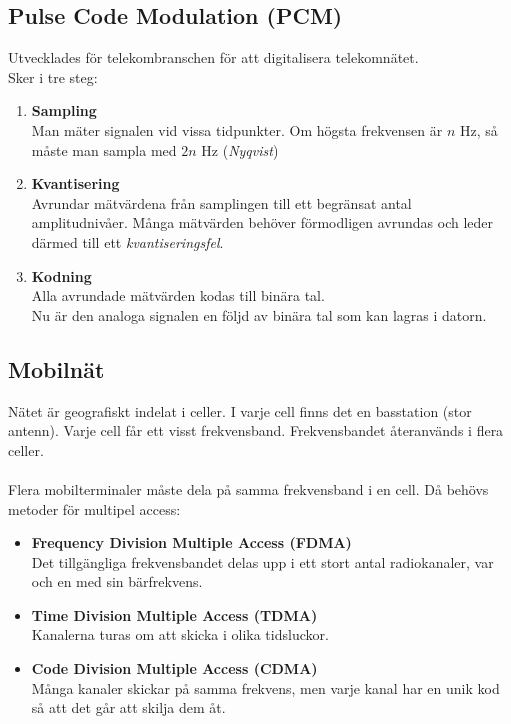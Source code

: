 \documentclass[11pt]{article}
\begin{document}
\subsection{Pulse Code Modulation (PCM)}
Utvecklades för telekombranschen för att digitalisera telekomnätet. \\ 
Sker i tre steg:
\begin{enumerate}
\item{\textbf{Sampling} \\
	Man mäter signalen vid vissa tidpunkter. Om högsta frekvensen är $n$ Hz, så måste man sampla med $2n$ Hz (\emph{Nyqvist})}
\item{\textbf{Kvantisering} \\
	Avrundar mätvärdena från samplingen till ett begränsat antal amplitudnivåer. Många mätvärden behöver förmodligen avrundas och leder därmed till ett \emph{kvantiseringsfel}.}
\item{\textbf{Kodning} \\
	Alla avrundade mätvärden kodas till binära tal. \\
	Nu är den analoga signalen en följd av binära tal som kan lagras i datorn.}
\end{enumerate}
\subsection{Mobilnät}
Nätet är geografiskt indelat i celler. I varje cell finns det en basstation (stor antenn). Varje cell får ett visst frekvensband. Frekvensbandet återanvänds i flera celler. \\ \\
Flera mobilterminaler måste dela på samma frekvensband i en cell. Då behövs metoder för multipel access: 
\begin{itemize}
\item{\textbf{Frequency Division Multiple Access (FDMA)} \\
Det tillgängliga frekvensbandet delas upp i ett stort antal radiokanaler, var och en med sin bärfrekvens.}
\item{\textbf{Time Division Multiple Access (TDMA)} \\
	Kanalerna turas om att skicka i olika tidsluckor.}
\item{\textbf{Code Division Multiple Access (CDMA)} \\
	Många kanaler skickar på samma frekvens, men varje kanal har en unik kod så att det går att skilja dem åt.}
\end{itemize}
\end{document}
